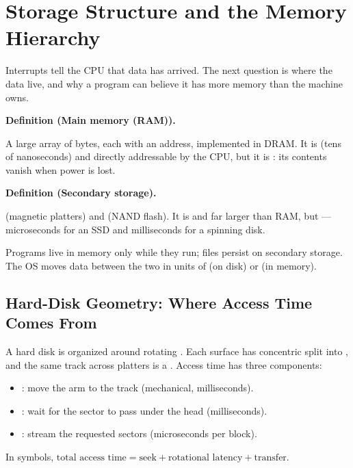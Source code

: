 \documentclass[11pt]{article}
\newenvironment{definitionbox}[1]{%
  \par\noindent\textbf{Definition (#1).}\ \itshape
}{\par\vspace{0.3em}}
\begin{document}
\section{Storage Structure and the Memory Hierarchy}
\label{sec:storage}

Interrupts tell the CPU that data has arrived. The next question is where the data live, and why a program can believe it has more memory than the machine owns.

\begin{definitionbox}{Main memory (RAM)}
A large array of bytes, each with an address, implemented in DRAM. It is  (tens of nanoseconds) and directly addressable by the CPU, but it is : its contents vanish when power is lost.
\end{definitionbox}

\begin{definitionbox}{Secondary storage}
 (magnetic platters) and  (NAND flash). It is  and far larger than RAM, but  --- microseconds for an SSD and milliseconds for a spinning disk.
\end{definitionbox}

Programs live in memory only while they run; files persist on secondary storage. The OS moves data between the two in units of  (on disk) or  (in memory).

\subsection{Hard-Disk Geometry: Where Access Time Comes From}

A hard disk is organized around rotating . Each surface has concentric  split into , and the same track across platters is a . Access time has three components:

\begin{itemize}
  \item {}: move the arm to the track (mechanical, milliseconds).
  \item {}: wait for the sector to pass under the head (milliseconds).
  \item {}: stream the requested sectors (microseconds per block).
\end{itemize}

In symbols, $\text{total access time} = \text{seek} + \text{rotational latency} + \text{transfer}$.
\end{document}
